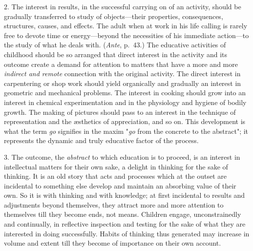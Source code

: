 \documentclass[showtrims,ustradepaper]{memoir}
\begin{document}

2. The interest in results, in the successful carrying on of an
activity, should be gradually transferred to
study
of objects---their properties, consequences, structures, causes, and
effects. The adult when at work in his life calling is rarely free to
devote time or energy---beyond the necessities of his immediate
action---to the study of what he deals with. (\emph{Ante}, p.\ 43.) The
educative activities of childhood should be so arranged that direct
interest in the activity and its outcome create a demand for attention
to matters that have a more and more \emph{indirect and remote}
connection with the original activity. The direct interest in
carpentering or shop work should yield organically and gradually an
interest in geometric and mechanical problems. The interest in cooking
should grow into an interest in chemical experimentation and in the
physiology and hygiene of bodily growth. The making of pictures should
pass to an interest in the technique of representation and the æsthetics
of appreciation, and so on. This development is what the term \emph{go}
signifies in the maxim "\emph{go} from the concrete to the abstract"; it
represents the dynamic and truly educative factor of the process.


3. The outcome, the \emph{abstract} to which education is to proceed, is
an interest in intellectual matters for their own sake, a delight in
thinking for the sake of thinking. It is an old story that acts and
processes which at the outset are incidental to something else develop
and maintain an absorbing value of their own. So it is with thinking and
with knowledge; at first incidental to results and adjustments beyond
themselves, they attract more and more attention to themselves till they
become ends, not means. Children engage, unconstrainedly and
continually, in reflective inspection and testing for the sake of what
they are interested in doing successfully. Habits of thinking thus
generated may increase in
volume
and extent till they become of importance on their own account.

\end{document}
